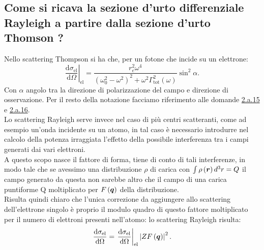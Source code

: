 \subsection[]{Come si ricava la sezione d'urto differenziale Rayleigh a partire dalla sezione d'urto Thomson ?}
\label{sec:3.b.26}
Nello scattering Thompson si ha che, per un fotone che incide su un elettrone:
\[
	\left.\frac{\mbox{d} \sigma_{\text{el}}}{\mbox{d} \Omega}\right|_{\text{el}} =  \frac{r^2_e\omega^4}{\left( \omega^2_0-\omega^2 \right)^2 + \omega^2\Gamma^2_{\text{tot}}\left( \omega \right)} \sin^2\alpha
.\] 
Con $\alpha$ angolo tra la direzione di polarizzazione del campo e direzione di osservazione. Per il resto della notazione facciamo riferimento alle domande \hyperref[subsec: 2.a.15]{2.a.15} e \hyperref[subsec: 2.a.16]{2.a.16}. \\
Lo scattering Rayleigh serve invece nel caso di più centri scatteranti, come ad esempio un'onda incidente su un atomo, in tal caso è necessario introdurre nel calcolo della potenza irraggiata l'effetto della possibile interferenza tra i campi generati dai vari elettroni.\\
A questo scopo nasce il fattore di forma, tiene di conto di tali interferenze, in modo tale che se avessimo una distribuzione $\rho$ di carica con $\int \rho\left( \boldsymbol{r}\right)d^3r=Q$ il campo generato da questa non sarebbe altro che il campo di una carica puntiforme Q moltiplicato per $F\left( \boldsymbol{q} \right) $ della distribuzione.\\
Risulta quindi chiaro che l'unica correzione da aggiungere allo scattering dell'elettrone singolo è proprio il modulo quadro di questo fattore moltiplicato per il numero di elettroni presenti nell'atomo: lo scattering Rayleigh risulta:
\[
	\frac{\mbox{d} \sigma_{\text{el}}}{\mbox{d} \Omega} = \left.\frac{\mbox{d} \sigma_{\text{el}}}{\mbox{d} \Omega}  \right|_{\text{el}}\left| ZF\left( \boldsymbol{q} \right)  \right| ^2
.\] 




